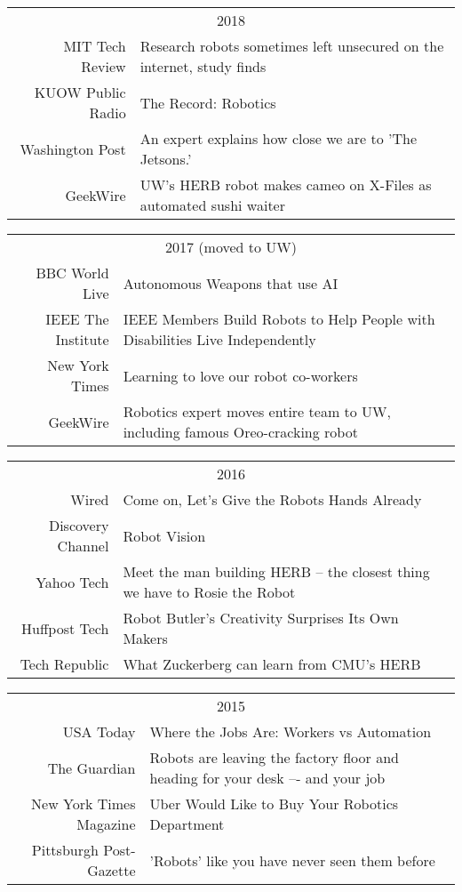 \begin{tabularx}{\linewidth}{rX}
\multicolumn{2}{c}{2018}\\ 
MIT Tech Review & Research robots sometimes left unsecured on the internet, study finds\\
KUOW Public Radio & The Record: Robotics\\
Washington Post & An expert explains how close we are to 'The Jetsons.'\\
GeekWire & UW’s HERB robot makes cameo on X-Files as automated sushi waiter\\
\end{tabularx}
\begin{tabularx}{\linewidth}{rX}
\multicolumn{2}{c}{2017 (moved to UW)}\\ 
BBC World Live & Autonomous Weapons that use AI\\
IEEE The Institute &  IEEE Members Build Robots to Help People with Disabilities Live Independently\\
New York Times & Learning to love our robot co-workers\\
GeekWire & Robotics expert moves entire team to UW, including famous Oreo-cracking robot\\
\end{tabularx}
\begin{tabularx}{\linewidth}{rX}
\multicolumn{2}{c}{2016}\\ 
Wired &  Come on, Let’s Give the Robots Hands Already\\
Discovery Channel &    Robot Vision\\
Yahoo Tech & Meet the man building HERB -- the closest thing we have to Rosie the Robot\\
Huffpost Tech &  Robot Butler's Creativity Surprises Its Own Makers\\
Tech Republic &  What Zuckerberg can learn from CMU's HERB\\
\end{tabularx}
\begin{tabularx}{\linewidth}{rX}
\multicolumn{2}{c}{2015}\\ 
USA Today &  Where the Jobs Are: Workers vs Automation\\
The Guardian  & Robots are leaving the factory floor and heading for your desk –- and your job\\
New York Times Magazine & Uber Would Like to Buy Your Robotics Department\\
Pittsburgh Post-Gazette & 'Robots' like you have never seen them before\\
\end{tabularx}
